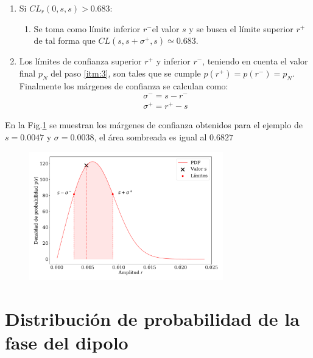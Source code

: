\begin{enumerate}
\begin{enumerate}
\begin{figure}[H]
        \end{figure}
    \end{enumerate}
    \item Si $CL_r(0,s,s)> 0.683$:
    \begin{enumerate}
        \item Se toma como límite inferior $r^-$el valor $s$ y se busca el límite superior $r^+$ de tal forma que $CL(s,s+\sigma^+,s) \simeq 0.683$.
    \end{enumerate}
    \item \label{pasofinal} Los límites de confianza superior $r^+$  y inferior $r^-$, teniendo en cuenta el valor final $p_N$ del paso \ref{itm:3}, son tales que se cumple $p(r^+)=p(r^-)=p_N$. Finalmente los márgenes de confianza se calculan como:
    \begin{align*}
        \sigma^- = s-r^-\\
        \sigma^+ = r^+ -s
    \end{align*}
\end{enumerate}

En la Fig.\ref{margenes} se muestran los márgenes de confianza obtenidos para el ejemplo de $s=0.0047$ y $\sigma=0.0038$, el área sombreada es igual al $0.6827$
\begin{figure}[H]
    \begin{small}
        \begin{center}
            \includegraphics[width=0.75\textwidth]{bessel_prob_ej_v2.pdf}
        \end{center}
        \caption{}
        \label{margenes}
    \end{small}
\end{figure}

\section{Distribución de probabilidad de la fase del dipolo}

